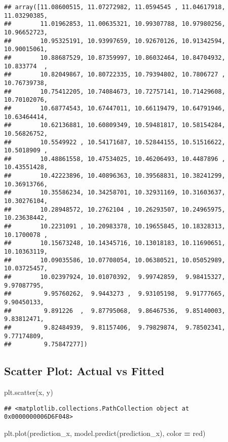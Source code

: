 \documentclass[
]{book}
\newenvironment{Shaded}{\begin{snugshade}}{\end{snugshade}}
\newcommand{\NormalTok}[1]{#1}
\newcommand{\OperatorTok}[1]{\textcolor[rgb]{0.81,0.36,0.00}{\textbf{#1}}}
\newcommand{\StringTok}[1]{\textcolor[rgb]{0.31,0.60,0.02}{#1}}
\begin{document}
\begin{verbatim}
## array([11.08600515, 11.07272982, 11.0594545 , 11.04617918, 11.03290385,
##        11.01962853, 11.00635321, 10.99307788, 10.97980256, 10.96652723,
##        10.95325191, 10.93997659, 10.92670126, 10.91342594, 10.90015061,
##        10.88687529, 10.87359997, 10.86032464, 10.84704932, 10.833774  ,
##        10.82049867, 10.80722335, 10.79394802, 10.7806727 , 10.76739738,
##        10.75412205, 10.74084673, 10.72757141, 10.71429608, 10.70102076,
##        10.68774543, 10.67447011, 10.66119479, 10.64791946, 10.63464414,
##        10.62136881, 10.60809349, 10.59481817, 10.58154284, 10.56826752,
##        10.5549922 , 10.54171687, 10.52844155, 10.51516622, 10.5018909 ,
##        10.48861558, 10.47534025, 10.46206493, 10.4487896 , 10.43551428,
##        10.42223896, 10.40896363, 10.39568831, 10.38241299, 10.36913766,
##        10.35586234, 10.34258701, 10.32931169, 10.31603637, 10.30276104,
##        10.28948572, 10.2762104 , 10.26293507, 10.24965975, 10.23638442,
##        10.2231091 , 10.20983378, 10.19655845, 10.18328313, 10.1700078 ,
##        10.15673248, 10.14345716, 10.13018183, 10.11690651, 10.10363119,
##        10.09035586, 10.07708054, 10.06380521, 10.05052989, 10.03725457,
##        10.02397924, 10.01070392,  9.99742859,  9.98415327,  9.97087795,
##         9.95760262,  9.9443273 ,  9.93105198,  9.91777665,  9.90450133,
##         9.891226  ,  9.87795068,  9.86467536,  9.85140003,  9.83812471,
##         9.82484939,  9.81157406,  9.79829874,  9.78502341,  9.77174809,
##         9.75847277])
\end{verbatim}

\hypertarget{scatter-plot-actual-vs-fitted}{%
\subsection{Scatter Plot: Actual vs Fitted}\label{scatter-plot-actual-vs-fitted}}

\begin{Shaded}
\begin{Highlighting}[]
\NormalTok{plt.scatter(x, y)}
\end{Highlighting}
\end{Shaded}

\begin{verbatim}
## <matplotlib.collections.PathCollection object at 0x0000000006D6F048>
\end{verbatim}

\begin{Shaded}
\begin{Highlighting}[]
\NormalTok{plt.plot(prediction\_x, model.predict(prediction\_x), color }\OperatorTok{=} \StringTok{\textquotesingle{}red\textquotesingle{}}\NormalTok{)}
\end{Highlighting}
\end{Shaded}
\end{document}
